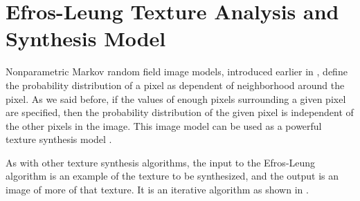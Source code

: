 {\section{Efros-Leung Texture Analysis and Synthesis Model}
\label{sect:Efros-Leung_texture}

Nonparametric Markov random field image models, introduced earlier in \chap{\ref{chapter:stat_image_models}}, define the probability distribution of a pixel as dependent of neighborhood around the pixel. As we said before, if the values of enough pixels surrounding a given pixel are specified, then the probability distribution of the given pixel is independent of the other pixels in the image. This image model can be used as a powerful texture synthesis model \cite{Efros99}.  


As with other texture synthesis algorithms, the input to the Efros-Leung algorithm \cite{Efros99} is an example of the texture to be synthesized, and the output is an image of more of that texture.  It is an iterative algorithm as shown in  \fig{\ref{fig:sampling_efros_leung}}.

}
